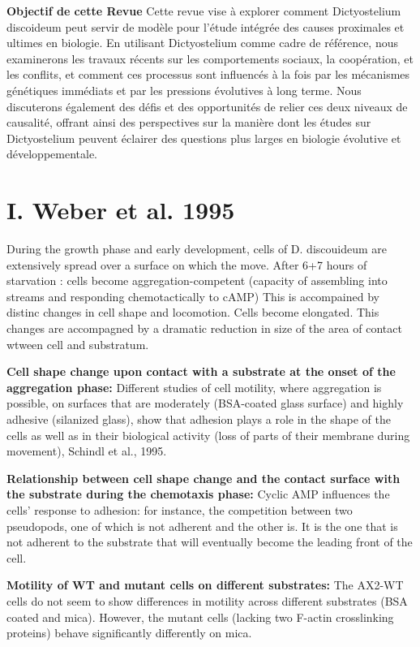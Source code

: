 \documentclass[twocolumn,10pt]{article} %
\begin{document}
\textbf{Objectif de cette Revue}
Cette revue vise à explorer comment Dictyostelium discoideum peut servir de modèle pour l'étude intégrée des causes proximales 
et ultimes en biologie. En utilisant Dictyostelium comme cadre de référence, nous examinerons les travaux récents sur les 
comportements sociaux, la coopération, et les conflits, et comment ces processus sont influencés à la fois par les mécanismes
 génétiques immédiats et par les pressions évolutives à long terme. Nous discuterons également des défis et des opportunités 
 de relier ces deux niveaux de causalité, offrant ainsi des perspectives sur la manière dont les études sur Dictyostelium
  peuvent éclairer des questions plus larges en biologie évolutive et développementale.


\section{I. Weber et al. 1995}

During the growth phase and early development, cells of D. discouideum are extensively spread over a surface on which the move.
After 6+7 hours of starvation : cells become aggregation-competent (capacity of assembling into streams and responding chemotactically to cAMP)
This is accompained by distinc changes in cell shape and locomotion. Cells become elongated. This changes are accompagned 
by a dramatic reduction in size of the area of contact wtween cell and substratum. \cite{Weber_1995}

\textbf{Cell shape change upon contact with a substrate at the onset of the aggregation phase:}
Different studies of cell motility, where aggregation is possible, on surfaces that are moderately (BSA-coated glass surface) and highly adhesive (silanized glass), show that adhesion plays a role in the shape of the cells as well as in their biological activity (loss of parts of their membrane during movement), Schindl et al., 1995.

\textbf{Relationship between cell shape change and the contact surface with the substrate during the chemotaxis phase:}
Cyclic AMP influences the cells' response to adhesion: for instance, the competition between two pseudopods, one of which is not adherent and the other is. It is the one that is not adherent to the substrate that will eventually become the leading front of the cell.

\textbf{Motility of WT and mutant cells on different substrates:}
The AX2-WT cells do not seem to show differences in motility across different substrates (BSA coated and mica).
However, the mutant cells (lacking two F-actin crosslinking proteins) behave significantly differently on mica.
\end{document}

